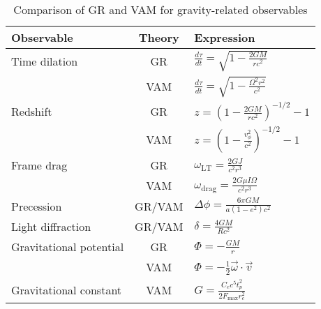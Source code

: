 \begin{table}[ht]
    \centering
    \caption{Comparison of GR and VAM for gravity-related observables}
    \label{tab:VAM-GR}
    \begin{tabular}{|l|c|l|}
        \hline
        \textbf{Observable} & \textbf{Theory} & \textbf{Expression} \\
        \hline
        Time dilation & GR & $ \frac{d\tau}{dt} = \sqrt{1 - \frac{2GM}{rc^2}} $ \\
        & VAM & $ \frac{d\tau}{dt} = \sqrt{1 - \frac{\Omega^2 r^2}{c^2}} $ \\
        \hline
        Redshift & GR & $ z = \left(1 - \frac{2GM}{rc^2} \right)^{-1/2} - 1 $ \\
        & VAM & $ z = \left(1 - \frac{v_\phi^2}{c^2} \right)^{-1/2} - 1 $ \\
        \hline
        Frame drag & GR & $ \omega_{\text{LT}} = \frac{2GJ}{c^2 r^3} $ \\
        & VAM & $ \omega_{\text{drag}} = \frac{2G \mu I \Omega}{c^2 r^3} $ \\
        \hline
        Precession & GR/VAM & $ \Delta\phi = \frac{6\pi GM}{a(1 - e^2)c^2} $ \\
        \hline
        Light diffraction & GR/VAM & $ \delta = \frac{4GM}{Rc^2} $ \\
        \hline
        Gravitational potential & GR & $ \Phi = -\frac{GM}{r} $ \\
        & VAM & $ \Phi = -\frac{1}{2} \vec{\omega} \cdot \vec{v} $ \\
        \hline
        Gravitational constant & VAM & $ G = \frac{C_e c^5 t_p^2}{2 F_{\max} r_c^2} $ \\
        \hline
    \end{tabular}
\end{table}